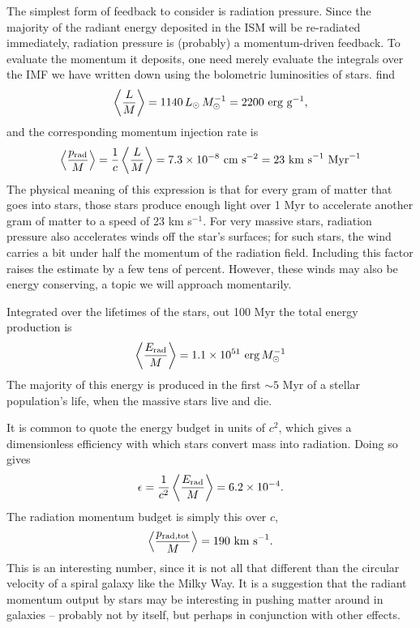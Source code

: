 The simplest form of feedback to consider is radiation pressure. Since the majority of the radiant energy deposited in the ISM will be re-radiated immediately, radiation pressure is (probably) a momentum-driven feedback. To evaluate the momentum it deposits, one need merely evaluate the integrals over the IMF we have written down using the bolometric luminosities of stars. \citet{murray10b} find
\begin{equation}
\left\langle \frac{L}{M}\right \rangle = 1140 \,L_{\odot}\,M_{\odot}^{-1} = 2200\mbox{ erg g}^{-1},
\end{equation}
and the corresponding momentum injection rate is
\begin{equation}
\left\langle \frac{p_{\rm rad}}{M}\right \rangle = \frac{1}{c} \left\langle \frac{L}{M}\right \rangle = 7.3\times 10^{-8}\mbox{ cm s}^{-2} = 23\mbox{ km s}^{-1}\mbox{ Myr}^{-1}
\end{equation}
The physical meaning of this expression is that for every gram of matter that goes into stars, those stars produce enough light over 1 Myr to accelerate another gram of matter to a speed of 23 km s$^{-1}$. For very massive stars, radiation pressure also accelerates winds off the star's surfaces; for such stars, the wind carries a bit under half the momentum of the radiation field. Including this factor raises the estimate by a few tens of percent.  However, these winds may also be energy conserving, a topic we will approach momentarily.

Integrated over the lifetimes of the stars, out 100 Myr the total energy production is
\begin{equation}
\left\langle \frac{E_{\rm rad}}{M}\right\rangle = 1.1\times 10^{51}\mbox{ erg}\,M_{\odot}^{-1}
\end{equation}
The majority of this energy is produced in the first $\sim 5$ Myr of a stellar population's life, when the massive stars live and die.

It is common to quote the energy budget in units of $c^2$, which gives a dimensionless efficiency with which stars convert mass into radiation. Doing so gives
\begin{equation}
\epsilon = \frac{1}{c^2} \left\langle \frac{E_{\rm rad}}{M}\right\rangle = 6.2\times 10^{-4}.
\end{equation}
The radiation momentum budget is simply this over $c$,
\begin{equation}
\left\langle \frac{p_{\rm rad,tot}}{M}\right\rangle = 190\mbox{ km s}^{-1}.
\end{equation}
This is an interesting number, since it is not all that different than the circular velocity of a spiral galaxy like the Milky Way. It is a suggestion that the radiant momentum output by stars may be interesting in pushing matter around in galaxies -- probably not by itself, but perhaps in conjunction with other effects.

